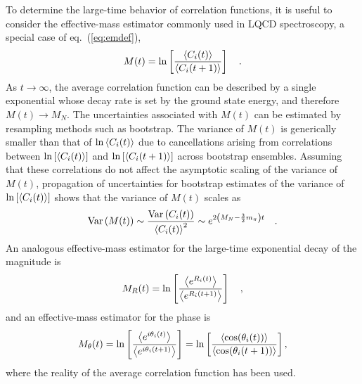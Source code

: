 To determine the large-time behavior of correlation functions, it is useful to consider the effective-mass estimator 
commonly used in LQCD spectroscopy, a special case of eq.~(\ref{eq:emdef}), 
%
\begin{equation}
  \begin{split}
    M(t) = \ln \left[ \frac{\left< C_i(t) \right>}{\left< C_i(t+1) \right>} \right]
    \ \ \  .
  \end{split}\label{EMdef}
\end{equation}
%
As $t\rightarrow \infty$, the average correlation function can be described by a single exponential whose  
decay rate is set by the ground state energy, and therefore $M(t)\rightarrow M_N$. 
The uncertainties associated with  $M(t)$ can be estimated by resampling methods such as 
bootstrap. 
The variance of $M(t)$ is generically smaller than that of $\ln\left< C_i(t) \right>$ due to cancellations arising from 
correlations between 
$\ln\left[\left< C_i(t) \right>\right]$ 
and 
$\ln\left[\left< C_i(t+1) \right>\right]$ 
across bootstrap ensembles. 
Assuming that these correlations do not affect the asymptotic scaling of the variance of $M(t)$, 
propagation of uncertainties for bootstrap estimates of the variance of 
$\ln\left[\left< C_i(t) \right>\right]$ 
shows that the variance of $M(t)$ scales as
%
\begin{equation}
  \begin{split}
    \text{Var}\left( M(t) \right) \sim \frac{\text{Var}\left( C_i(t) \right)}{\left< C_i(t) \right>^2} \sim e^{2\left( M_N - \frac{3}{2}m_\pi \right)t}
    \ \ \ .
  \end{split}
  \label{EMLepage}
\end{equation}
%
An analogous effective-mass estimator for the large-time exponential decay of the magnitude is
%
\begin{equation}
  \begin{split}
    M_R(t) = \ln \left[ \frac{\left< e^{R_i(t)} \right>}{\left< e^{R_i(t+1)} \right>} \right]
    \ \ \ ,
  \end{split}
  \label{EMRdef}
\end{equation}
%
and an effective-mass estimator for the  phase is
%
\begin{equation}
  \begin{split}
    M_\theta(t) = \ln \left[  \frac{\left< e^{i\theta_i(t)} \right>}{\left< e^{i\theta_i(t+1)} \right>} \right] 
    = 
    \ln \left[ \frac{\left< \cos(\theta_i(t)) \right>}{\left< \cos(\theta_i(t+1)) \right>} \right],
  \end{split}
  \label{EMThdef}
\end{equation}
%
where the reality of the average correlation function has been used.  

